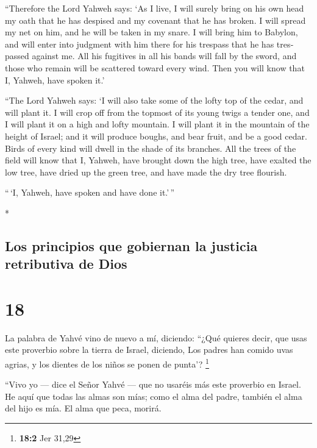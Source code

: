 \begin{paracol}{2}
\begin{otherlanguage}{english}
 ``Therefore the Lord Yahweh says: `As I live, I will
surely bring on his own head my oath that he has despised and my
covenant that he has broken.  I will spread my net on
him, and he will be taken in my snare. I will bring him to Babylon, and
will enter into judgment with him there for his trespass that he has
trespassed against me.  All his fugitives in all his
bands will fall by the sword, and those who remain will be scattered
toward every wind. Then you will know that I, Yahweh, have spoken it.'

 ``The Lord Yahweh says: `I will also take some of the
lofty top of the cedar, and will plant it. I will crop off from the
topmost of its young twigs a tender one, and I will plant it on a high
and lofty mountain.  I will plant it in the mountain of
the height of Israel; and it will produce boughs, and bear fruit, and be
a good cedar. Birds of every kind will dwell in the shade of its
branches.  All the trees of the field will know that I,
Yahweh, have brought down the high tree, have exalted the low tree, have
dried up the green tree, and have made the dry tree flourish.

``\,`I, Yahweh, have spoken and have done it.'\,''

\end{otherlanguage}

\switchcolumn[0]*

\hypertarget{los-principios-que-gobiernan-la-justicia-retributiva-de-dios}{%
\subsection{Los principios que gobiernan la justicia retributiva de
Dios}\label{los-principios-que-gobiernan-la-justicia-retributiva-de-dios}}

\hypertarget{section-34}{%
\section{18}\label{section-34}}

 La palabra de Yahvé vino de nuevo a mí, diciendo:
 ``¿Qué quieres decir, que usas este proverbio sobre la
tierra de Israel, diciendo, Los padres han comido uvas agrias, y los
dientes de los niños se ponen de punta'? \footnote{\textbf{18:2} Jer
  31,29}

 ``Vivo yo --- dice el Señor Yahvé --- que no usaréis más
este proverbio en Israel.  He aquí que todas las almas son
mías; como el alma del padre, también el alma del hijo es mía. El alma
que peca, morirá.


\end{paracol}
